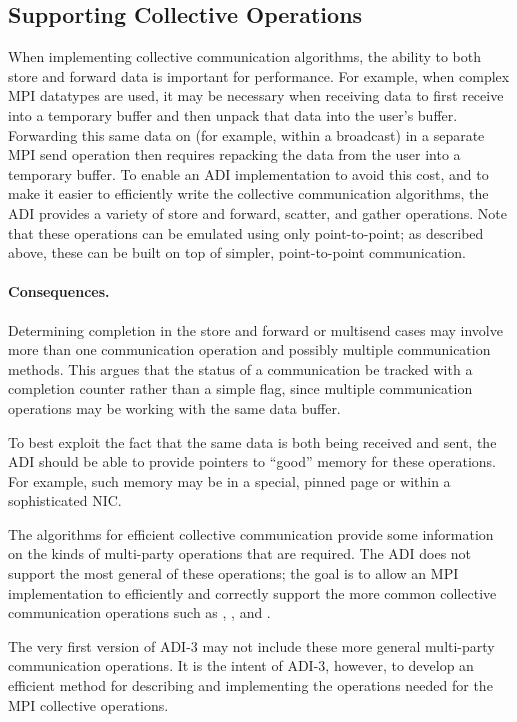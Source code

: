 \subsection{Supporting Collective Operations}
When implementing collective communication algorithms, the ability to
both store and forward data is important for performance.  For
example, when complex MPI datatypes are used, it may be necessary when
receiving data to first receive into a temporary buffer and then
unpack that data into the user's buffer.  Forwarding this same data on
(for example, within a broadcast) in a separate MPI send operation
then requires repacking the data from the user into a temporary
buffer.  To enable an ADI implementation to avoid this cost, and to
make it easier to efficiently write the collective communication
algorithms, the ADI provides a variety of store and forward, scatter,
and gather operations.  Note that these operations can be emulated
using only point-to-point; as described above, these can be built on
top of simpler, point-to-point communication.  


\paragraph{Consequences.}
Determining completion in the store and forward or multisend cases may involve
more than one communication 
operation and possibly multiple communication methods.  This argues
that the status of a communication be tracked with a completion
counter rather than a simple flag, since multiple communication
operations may be working with the same data buffer.  

To best exploit the fact that the same data is both being received and
sent, the ADI should be able to provide pointers to ``good'' memory
for these operations.  For example, such memory may be in a special,
pinned page or within a sophisticated NIC.  

The algorithms for efficient collective communication provide some
information on the kinds of multi-party operations that are required.
The ADI does not support the most general of these operations; the
goal is to allow an MPI implementation to efficiently and correctly
support the more common collective communication operations such as
, , and .

The very first version of ADI-3 may not include these more general
multi-party communication operations.  It is the intent of ADI-3,
however, to develop an efficient method for describing and
implementing the operations needed for the MPI collective operations.

